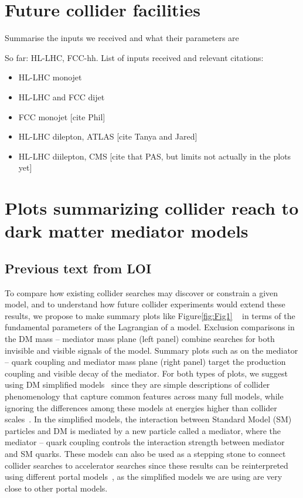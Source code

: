 \documentclass[11pt]{article}
\begin{document}
\section{Future collider facilities}
\label{sec:colliders}

Summarise the inputs we received and what their parameters are

So far: HL-LHC, FCC-hh. 
List of inputs received and relevant citations:
\begin{itemize}
    \item HL-LHC monojet~\cite{hllhc-monojet}
    \item HL-LHC and FCC dijet~\cite{Harris:2022kls}
    \item FCC monojet [cite Phil]
    \item HL-LHC dilepton, ATLAS [cite Tanya and Jared]
    \item HL-LHC diilepton, CMS [cite that PAS, but limits not actually in the plots yet]
\end{itemize}

\section{Plots summarizing collider reach to dark matter mediator models}

\subsection{Previous text from LOI}

To compare how existing collider searches may discover or constrain a given model, and to understand how future collider experiments would extend these results, we propose to make summary plots like Figure\ref{fig:Fig1} ~\cite{CMSSummary,ATL-PHYS-DMSUM-JHEP-2019} in terms of the fundamental parameters of the Lagrangian of a model. 
Exclusion comparisons in the DM mass – mediator mass plane (left panel) combine searches for both invisible and visible signals of the model. Summary plots such as on the mediator – quark coupling and mediator mass plane (right panel) target the production coupling and visible decay of the mediator. For both types of plots, we suggest using DM simplified models~\cite{ABERCROMBIE2020100371} since they are simple descriptions of collider phenomenology that capture common features across many full models, while ignoring the differences among these models at energies higher than collider scales~\cite{doi:10.1146/annurev-nucl-101917-021008}. In the simplified models, the interaction between Standard Model (SM) particles and DM is mediated by a new particle called a mediator, where the mediator – quark coupling controls the interaction strength between mediator and SM quarks. These models can also be used as a stepping stone to connect collider searches to accelerator searches since these results can be reinterpreted using different portal models~\cite{Beacham:2652223}, as the simplified models we are using are very close to other portal models. 
\end{document}

